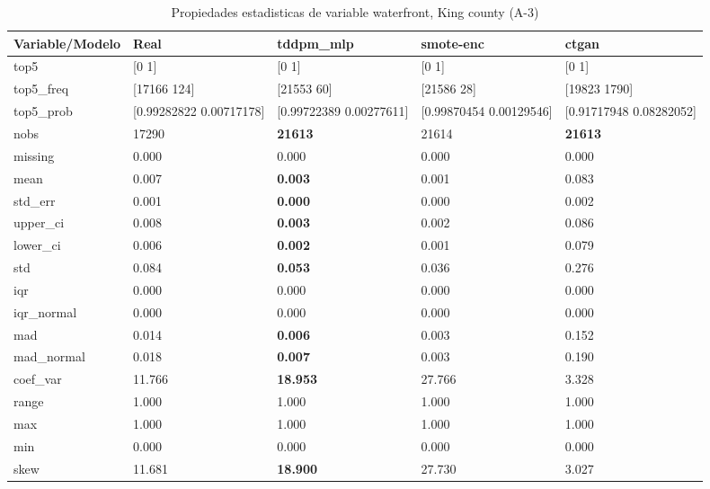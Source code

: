 \begin{table}[H]
\centering
\fontsize{8}{14}\selectfont
\caption{Propiedades  estadisticas de variable waterfront, King county (A-3)}
\label{table-stats-king county-a-3-waterfront}
\begin{tabular}{|l|m{10em}|m{10em}|m{10em}|m{10em}|}
\hline
 \rowcolor[gray]{0.8}
Variable/Modelo & Real & tddpm\_mlp & smote-enc & ctgan \\
\hline top5 & [0 1] & [0 1] & [0 1] & [0 1] \\
\hline top5\_freq & [17166   124] & [21553    60] & [21586    28] & [19823  1790] \\
\hline top5\_prob & [0.99282822 0.00717178] & [0.99722389 0.00277611] & [0.99870454 0.00129546] & [0.91717948 0.08282052] \\
\hline nobs & 17290 & \bfseries 21613 & \cellcolor[rgb]{0.9, 0.54, 0.52} 21614 & \bfseries 21613 \\
\hline missing & 0.000 & 0.000 & 0.000 & 0.000 \\
\hline mean & 0.007 & \bfseries 0.003 & 0.001 & \cellcolor[rgb]{0.9, 0.54, 0.52} 0.083 \\
\hline std\_err & 0.001 & \bfseries 0.000 & 0.000 & \cellcolor[rgb]{0.9, 0.54, 0.52} 0.002 \\
\hline upper\_ci & 0.008 & \bfseries 0.003 & 0.002 & \cellcolor[rgb]{0.9, 0.54, 0.52} 0.086 \\
\hline lower\_ci & 0.006 & \bfseries 0.002 & 0.001 & \cellcolor[rgb]{0.9, 0.54, 0.52} 0.079 \\
\hline std & 0.084 & \bfseries 0.053 & 0.036 & \cellcolor[rgb]{0.9, 0.54, 0.52} 0.276 \\
\hline iqr & 0.000 & 0.000 & 0.000 & 0.000 \\
\hline iqr\_normal & 0.000 & 0.000 & 0.000 & 0.000 \\
\hline mad & 0.014 & \bfseries 0.006 & 0.003 & \cellcolor[rgb]{0.9, 0.54, 0.52} 0.152 \\
\hline mad\_normal & 0.018 & \bfseries 0.007 & 0.003 & \cellcolor[rgb]{0.9, 0.54, 0.52} 0.190 \\
\hline coef\_var & 11.766 & \bfseries 18.953 & \cellcolor[rgb]{0.9, 0.54, 0.52} 27.766 & 3.328 \\
\hline range & 1.000 & 1.000 & 1.000 & 1.000 \\
\hline max & 1.000 & 1.000 & 1.000 & 1.000 \\
\hline min & 0.000 & 0.000 & 0.000 & 0.000 \\
\hline skew & 11.681 & \bfseries 18.900 & \cellcolor[rgb]{0.9, 0.54, 0.52} 27.730 & 3.027 \\

\end{tabular}
\end{table}
